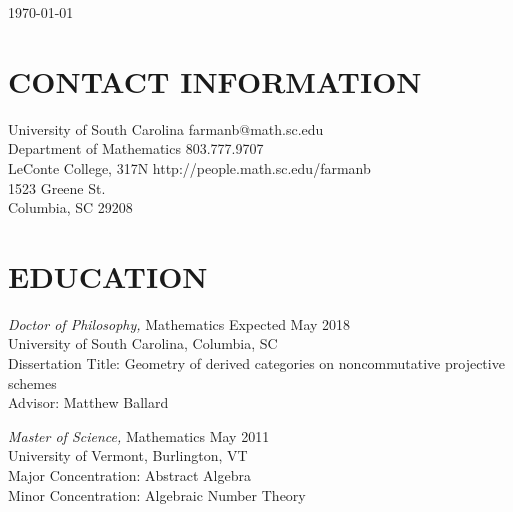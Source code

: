 \documentclass[line,overlapped]{res}
\begin{document}
\hfill \today

\begin{resume}
  
  
  \section{CONTACT INFORMATION}
  University of South Carolina \hfill farmanb@math.sc.edu\\
  Department of Mathematics \hfill 803.777.9707\\
  LeConte College, 317N \hfill http://people.math.sc.edu/farmanb\\
  1523 Greene St.\\
  Columbia, SC 29208
  
  \section{EDUCATION} 
          {\sl Doctor of Philosophy,} Mathematics \hfill Expected May 2018\\
          University of South Carolina, Columbia, SC\\
          Dissertation Title: Geometry of derived categories on noncommutative projective schemes\\
          Advisor: Matthew Ballard

          {\sl Master of Science,} Mathematics \hfill May 2011\\
          University of Vermont, Burlington, VT\\
          Major Concentration: Abstract Algebra\\
          Minor Concentration: Algebraic Number Theory


\end{resume}
\end{document}

